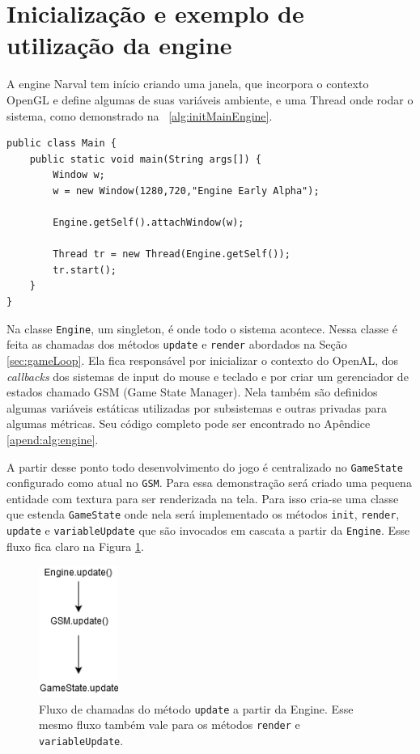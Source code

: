 \documentclass[12pt, 
openright, 
oneside, 
a4paper,    
brazil]{facom-ufu-abntex2}
\begin{document}
\section{Inicialização e exemplo de utilização da engine}

A engine Narval tem início criando uma janela, que incorpora o contexto OpenGL e define algumas de suas variáveis ambiente, e uma Thread onde rodar o sistema, como demonstrado na \lstlistingname~\ref{alg:initMainEngine}.
 \begin{lstlisting}[caption=Classe Main, label={alg:initMainEngine}]
public class Main {
	public static void main(String args[]) {
		Window w;
		w = new Window(1280,720,"Engine Early Alpha");
		
		Engine.getSelf().attachWindow(w);

		Thread tr = new Thread(Engine.getSelf());
		tr.start();
	}
}
\end{lstlisting}

Na classe \texttt{Engine}, um singleton, é onde todo o sistema acontece. Nessa classe é feita as chamadas dos métodos \texttt{update} e \texttt{render} abordados na Seção \ref{sec:gameLoop}. Ela fica responsável por inicializar o contexto do OpenAL, dos \textit{callbacks} dos sistemas de input do mouse  e teclado e por criar um gerenciador de estados chamado GSM (Game State Manager). Nela também são definidos algumas variáveis estáticas utilizadas por subsistemas e outras privadas para algumas métricas. Seu código completo pode ser encontrado no Apêndice \ref{apend:alg:engine}.

A partir desse ponto todo desenvolvimento do jogo é centralizado no \texttt{GameState} configurado como atual no \texttt{GSM}. Para essa demonstração será criado uma pequena entidade com textura para ser renderizada na tela. Para isso cria-se uma classe que estenda \texttt{GameState} onde nela será implementado os métodos \texttt{init}, \texttt{render}, \texttt{update} e \texttt{variableUpdate} que são invocados em cascata a partir da \texttt{Engine}. Esse fluxo fica claro na Figura \ref{fig:updateRenderCallFlow}.

\begin{figure}[H]
	\centering
	\includegraphics[width=7em]{imagens/updateFlow.png}
	\caption{Fluxo de chamadas do método \texttt{update} a partir da Engine. Esse mesmo fluxo também vale para os métodos \texttt{render} e \texttt{variableUpdate}.}
	\label{fig:updateRenderCallFlow}
\end{figure}
\end{document}
